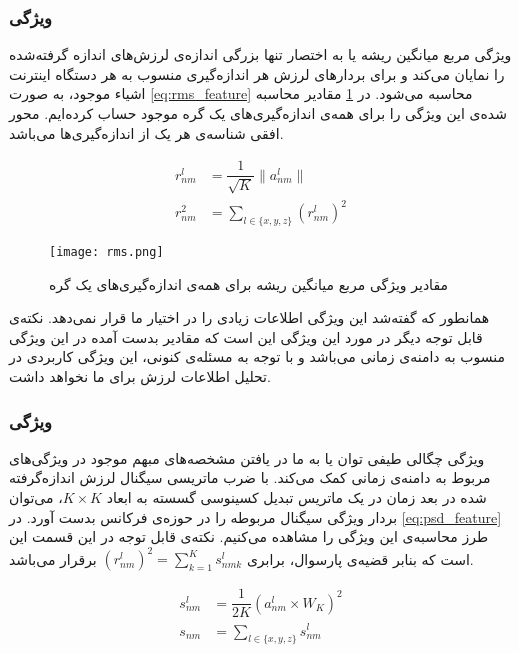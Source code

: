 \subsubsection{ویژگی }
ویژگی مربع میانگین ریشه یا به اختصار  تنها بزرگی اندازه‌ی لرزش‌های اندازه‌ گرفته‌شده را نمایان می‌کند و برای بردارهای لرزش هر اندازه‌گیری منسوب به هر دستگاه اینترنت اشیاء موجود، به صورت \cref{eq:rms_feature} محاسبه می‌شود. در \cref{fig:rms} مقادیر محاسبه شده‌ی این ویژگی را برای همه‌ی اندازه‌گیری‌های یک گره موجود حساب کرده‌ایم. محور افقی شناسه‌ی هر یک از اندازه‌گیری‌ها می‌باشد.

\begin{equation}
\label{eq:rms_feature}
\begin{split} 
r^l_{nm} & = \dfrac{1}{\sqrt{K}}\|a^l_{nm}\|\\
r^2_{nm} &  = \sum_{l \in \{x, y, z\}} (r^l_{nm})^2
\end{split} 
\end{equation}


\begin{figure}[!h]
\centerline{\texttt{[image: rms.png]}}
\caption{مقادیر ویژگی مربع میانگین ریشه برای همه‌ی اندازه‌گیری‌های یک گره}
\label{fig:rms}
\end{figure}

همانطور که گفته‌شد این ویژگی اطلاعات زیادی را در اختیار ما قرار نمی‌دهد. نکته‌ی قابل توجه دیگر در مورد این ویژگی این است که مقادیر بدست آمده در این ویژگی منسوب به دامنه‌ی زمانی می‌باشد و با توجه به مسئله‌ی کنونی، این ویژگی کاربردی در تحلیل اطلاعات لرزش برای ما نخواهد داشت.


\subsubsection{ویژگی }
ویژگی چگالی طیفی توان یا  به ما در یافتن مشخصه‌های مبهم موجود در ویژگی‌های مربوط به دامنه‌ی زمانی کمک می‌کند. با ضرب ماتریسی سیگنال لرزش اندازه‌گرفته شده در بعد زمان در یک ماتریس تبدیل کسینوسی گسسته به ابعاد $K \times K$، می‌توان بردار ویژگی سیگنال مربوطه را در حوزه‌ی فرکانس بدست آورد. در \cref{eq:psd_feature} طرز محاسبه‌ی این ویژگی را مشاهده می‌کنیم. نکته‌ی قابل توجه در این قسمت این است که بنابر قضیه‌ی پارسوال، برابری $(r^l_{nm})^2 = \sum_{k = 1}^{K}s^l_{nmk}$ برقرار می‌باشد.

\begin{equation}
\label{eq:psd_feature}
\begin{split} 
s^l_{nm} & = \dfrac{1}{2K}(a^l_{nm} \times W_K)^2\\
s_{nm} &  = \sum_{l \in \{x, y, z\}} s^l_{nm}
\end{split} 
\end{equation}

